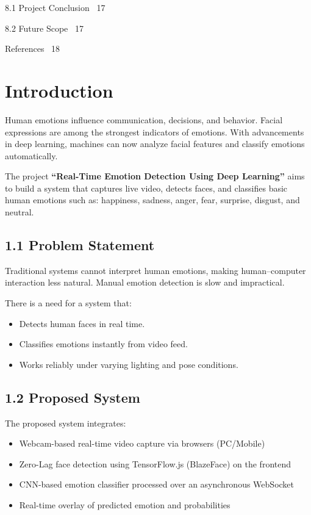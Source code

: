 \documentclass[12pt,a4paper]{report}
\begin{document}
\hspace{1.2cm}8.1 \quad Project Conclusion \dotfill\ 17

\hspace{1.2cm}8.2 \quad Future Scope \dotfill\ 17

\bigskip

 \quad References \dotfill\ 18



\chapter{Introduction}
\setcounter{page}{1}

Human emotions influence communication, decisions, and behavior. Facial expressions
are among the strongest indicators of emotions. With advancements in deep learning,
machines can now analyze facial features and classify emotions automatically.

The project \textbf{“Real-Time Emotion Detection Using Deep Learning”} aims to build a system
that captures live video, detects faces, and classifies basic human emotions such as:
happiness, sadness, anger, fear, surprise, disgust, and neutral.

\section*{1.1 Problem Statement}

Traditional systems cannot interpret human emotions, making human–computer
interaction less natural. Manual emotion detection is slow and impractical.

There is a need for a system that:
\begin{itemize}
    \item Detects human faces in real time.
    \item Classifies emotions instantly from video feed.
    \item Works reliably under varying lighting and pose conditions.
\end{itemize}

\section*{1.2 Proposed System}

The proposed system integrates:
\begin{itemize}
    \item Webcam-based real-time video capture via browsers (PC/Mobile)
    \item Zero-Lag face detection using TensorFlow.js (BlazeFace) on the frontend
    \item CNN-based emotion classifier processed over an asynchronous WebSocket
    \item Real-time overlay of predicted emotion and probabilities
\end{itemize}
\end{document}
